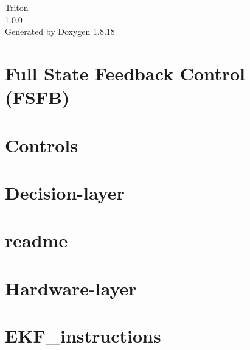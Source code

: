 \let\mypdfximage\pdfximage\def\pdfximage{\immediate\mypdfximage}\documentclass[twoside]{book}
\newcommand{\+}{\discretionary{\mbox{\scriptsize$\hookleftarrow$}}{}{}}
\newcommand{\clearemptydoublepage}{%
  \newpage{\pagestyle{empty}\cleardoublepage}%
}
\begin{document}
\hypersetup{pageanchor=false,
             bookmarksnumbered=true,
             pdfencoding=unicode
            }
\begin{titlepage}
\vspace*{7cm}
\begin{center}%
{\Large Triton \\[1ex]\large 1.\+0.\+0 }\\
\vspace*{1cm}
{\large Generated by Doxygen 1.8.18}\\
\end{center}
\end{titlepage}
\clearemptydoublepage
{}
\tableofcontents
\clearemptydoublepage
{}
\hypersetup{pageanchor=true}

\chapter{Full State Feedback Control (F\+S\+FB)}
\label{md_controls_fsfb_README}

\chapter{Controls}
\label{md_controls_README}

\chapter{Decision-\/layer}
\label{md_decisions_README}

\chapter{readme}
\label{md_documentation_readme}

\chapter{Hardware-\/layer}
\label{md_hardware_README}

\chapter{E\+K\+F\+\_\+instructions}
\label{md_mapping_EKF_instructions}

\end{document}
